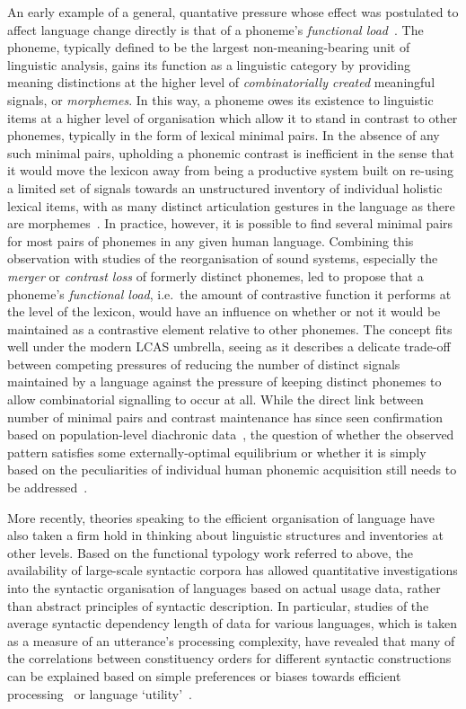 An early example of a general, quantative pressure whose effect was postulated to affect language change directly is that of a phoneme's \emph{functional load}~\citep{Martinet1955}. The phoneme, typically defined to be the largest non-meaning-bearing unit of linguistic analysis, gains its function as a linguistic category by providing meaning distinctions at the higher level of \emph{combinatorially created} meaningful signals, or \emph{morphemes}. In this way, a phoneme owes its existence to linguistic items at a higher level of organisation which allow it to stand in contrast to other phonemes, typically in the form of lexical minimal pairs. In the absence of any such minimal pairs, upholding a phonemic contrast is inefficient in the sense that it would move the lexicon away from being a productive system built on re-using a limited set of signals towards an unstructured inventory of individual holistic lexical items, with as many distinct articulation gestures in the language as there are morphemes~\citep{Spike2017}.
In practice, however, it is possible to find several minimal pairs for most pairs of phonemes in any given human language. Combining this observation with studies of the reorganisation of sound systems, especially the \emph{merger} or \emph{contrast loss} of formerly distinct phonemes, led \citet{Martinet1955} to propose that a phoneme's \emph{functional load}, i.e.~the amount of contrastive function it performs at the level of the lexicon, would have an influence on whether or not it would be maintained as a contrastive element relative to other phonemes. The concept fits well under the modern LCAS umbrella, seeing as it describes a delicate trade-off between competing pressures of reducing the number of distinct signals maintained by a language against the pressure of keeping distinct phonemes to allow combinatorial signalling to occur at all. While the direct link between number of minimal pairs and contrast maintenance has since seen confirmation based on population-level diachronic data~\citep{Wedel2013short}, the question of whether the observed pattern satisfies some externally-optimal equilibrium or whether it is simply based on the peculiarities of individual human phonemic acquisition still needs to be addressed~\citep{Spike2017}.

More recently, theories speaking to the efficient organisation of language have also taken a firm hold in thinking about linguistic structures and inventories at other levels.
Based on the functional typology work referred to above, the availability of large-scale syntactic corpora has allowed quantitative investigations into the syntactic organisation of languages based on actual usage data, rather than abstract principles of syntactic description. In particular, studies of the average syntactic dependency length of data for various languages, which is taken as a measure of an utterance's processing complexity, have revealed that many of the correlations between constituency orders for different syntactic constructions can be explained based on simple preferences or biases towards efficient processing~\citep{Futrell2015} or language `utility'~\citep{Jaeger2010}.

